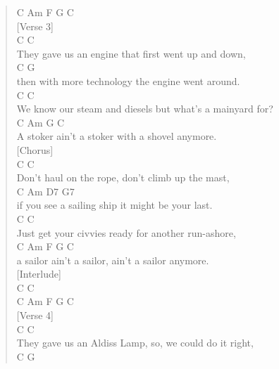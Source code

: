 \documentclass[11pt]{article}
\begin{document}
\begin{verse}
C    Am   F G  C\\
\vspace*{1em}
[Verse 3]\\
\hspace*{5em}C                      C\\
They gave us an engine that first went up and down,\\
C                             G\\
then with more technology the engine went around.\\
\hspace*{3em}C                              C\\
We know our steam and diesels but what's a mainyard for?\\
\hspace*{2em}C                            Am     G  C\\
A stoker ain't a stoker with a shovel anymore.\\
\vspace*{1em}
[Chorus]\\
\hspace*{6em}C                       C\\
Don't haul on the rope, don't climb up the mast,\\
C            Am              D7            G7\\
if you see a sailing ship it might be your last.\\
\hspace*{5em}C                           C\\
Just get your civvies ready for another run-ashore,\\
\hspace*{2em}C              Am              F      G  C\\
a sailor ain't a sailor, ain't a sailor anymore.\\
\vspace*{1em}
[Interlude]\\
C         C\\
C    Am   F G  C\\
\vspace*{1em}
[Verse 4]\\
\hspace*{5em}C                           C\\
They gave us an Aldiss Lamp, so, we could do it right,\\
\hspace*{5em}C                   G\\

\end{verse}
\end{document}
